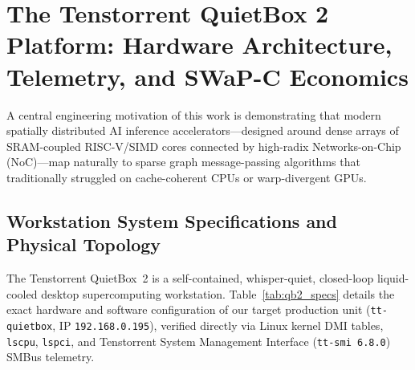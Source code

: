 \documentclass[10pt]{article}
\begin{document}
\section{The Tenstorrent QuietBox 2 Platform: Hardware Architecture, Telemetry, and SWaP-C Economics}
\label{sec:qb2_hardware}

A central engineering motivation of this work is demonstrating that modern spatially distributed AI inference accelerators---designed around dense arrays of SRAM-coupled RISC-V/SIMD cores connected by high-radix Networks-on-Chip (NoC)---map naturally to sparse graph message-passing algorithms that traditionally struggled on cache-coherent CPUs or warp-divergent GPUs.

\subsection{Workstation System Specifications and Physical Topology}

The Tenstorrent QuietBox~2 is a self-contained, whisper-quiet, closed-loop liquid-cooled desktop supercomputing workstation. Table~\ref{tab:qb2_specs} details the exact hardware and software configuration of our target production unit (\texttt{tt-quietbox}, IP \texttt{192.168.0.195}), verified directly via Linux kernel DMI tables, \texttt{lscpu}, \texttt{lspci}, and Tenstorrent System Management Interface (\texttt{tt-smi 6.8.0}) SMBus telemetry.
\end{document}
